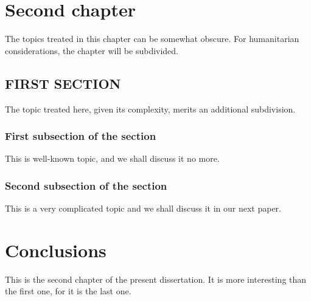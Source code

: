 \documentclass[dvipdfm,final]{pittetd}%
\begin{document}
\chapter{Second chapter}
The topics treated in this chapter can be somewhat obscure. For humanitarian considerations, the chapter will be subdivided.
\section{FIRST SECTION}%
The topic treated here, given its complexity, merits an additional subdivision.
\subsection{First subsection of the section}
This is well-known topic, and we shall discuss it no more.
\subsection{Second subsection of the section}
This is a very complicated topic and we shall discuss it in our next paper.
\chapter{Conclusions}
This is the second chapter of the present dissertation. It is more interesting than the first one, for it is the last one.
%
%
\end{document}
